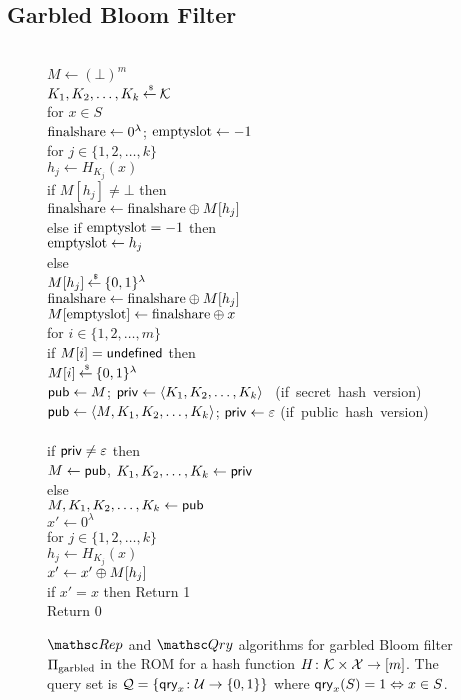 \subsection{Garbled Bloom Filter}
\begin{figure}
\centering
{}
{
\\
$M \gets (\bot)^m$\\
$K_1,K_2,\ldots, K_k {\:\stackrel{{\scriptscriptstyle \hspace{0.2em}\$}} {\leftarrow}\:} {\cal K}$\\
for $x \in S$\\
\nudge $\mathrm{finalshare} \gets 0^\lambda$; $\mathrm{emptyslot} \gets -1$\\
\nudge for $j \in \{1,2,\ldots, k\}$\\
\nudge \nudge $h_j \gets H_{K_j}(x)$\\
\nudge \nudge if $M[h_j] \neq \bot$ then\\
\nudge \nudge \nudge $\mathrm{finalshare} \gets \mathrm{finalshare} {\:\oplus\:} M[h_j]$\\
\nudge \nudge else if $\mathrm{emptyslot} = -1$ then\\
\nudge \nudge \nudge $\mathrm{emptyslot} \gets h_j$\\
\nudge \nudge else\\
\nudge \nudge \nudge $M[h_j] {\:\stackrel{{\scriptscriptstyle \hspace{0.2em}\$}} {\leftarrow}\:} \{0,1\}^\lambda$\\
\nudge \nudge \nudge $\mathrm{finalshare} \gets \mathrm{finalshare} {\:\oplus\:} M[h_j]$\\
\nudge $M[\mathrm{emptyslot}] \gets \mathrm{finalshare} {\:\oplus\:} x$\\
for $i \in \{1,2,\ldots, m\}$\\
\nudge if $M[i] = \mathsf{undefined}$ then\\
\nudge \nudge  $M[i] {\:\stackrel{{\scriptscriptstyle \hspace{0.2em}\$}} {\leftarrow}\:} \{0,1\}^\lambda$\\
${\sf pub} \gets M$; ${\sf priv} \gets \langle K_1,K_2,\ldots,K_k \rangle$ \mbox{ (if secret hash version)}\\
${\sf pub} \gets \langle M,K_1,K_2,\ldots,K_k \rangle$; ${\sf priv} \gets \varepsilon$ \mbox{(if public hash version)}\\

\medskip
{}\\
if ${\sf priv} \neq \varepsilon$ then\\
\nudge $M \gets {\sf pub}$, $K_1,K_2,\ldots,K_k \gets {\sf priv}$\\
else\\
\nudge $M,K_1,K_2,\ldots,K_k \gets {\sf pub}$\\
$x' \gets 0^\lambda$\\
for $j \in \{1,2,\dots,k\}$\\
\nudge $h_j \gets H_{K_j}(x)$\\
\nudge $x' \gets x' {\:\oplus\:} M[h_j]$\\
if $x' =x $ then Return 1\\
Return 0
}
\caption{ $\Rep$ and $\Qry$ algorithms for garbled Bloom
  filter $\Pi_{\mathrm{garbled}}$ in the ROM for a hash function $H\colon {\cal K} \times
 {\cal X} \to [m]$. The query set is ${\cal Q}=\{\mathsf{qry}_x\colon
  {\cal U} \to \{0,1\}\}$ where $\mathsf{qry}_x(S)=1 \Leftrightarrow x \in S$.}

\end{figure}


